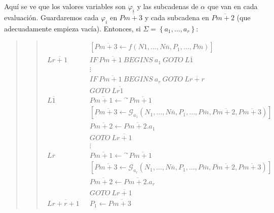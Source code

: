 \documentclass[a4paper, 12pt]{article}
\begin{document}
Aquí se ve que los valores variables son $\varphi_i$ y las subcadenas de
$\alpha$ que van en cada evaluación. Guardaremos cada $\varphi_i$ en
$P\overline{m+3}$ y cada subcadena en $P\overline{m+2}$ (que adecuadamente
empieza vacía). Entonces, si $\Sigma = \left\{ a_1, \ldots, a_r \right\} $:


\small
\begin{quote}

\begin{quote}
\begin{align*}
    &[ P\overline{m+3} \leftarrow  f(N1, \ldots, N{\overline{n}}, P_1, \ldots, P
    \overline{m})] \\ 
    L \overline{r+1} ~ ~ ~  &IF ~ P \overline{m+1} ~ BEGINS ~ a_1 ~ GOTO ~ L \overline{1} \\ 
          &\vdots \\ 
          &IF ~ P \overline{m+1} ~ BEGINS ~ a_r ~ GOTO ~ L
    \overline{r+r} \\ 
                          &GOTO ~ L \overline{r1} \\
    L \overline{1} ~ ~ ~ & P \overline{m+1} \leftarrow  {}^{\curvearrowright}
    P \overline{m+1} \\ 
                           &\left[ P \overline{m+3} \leftarrow
                           \mathcal{G}_{a_{1}} \left( N_1, \ldots, N
                       \overline{n}, P_1, \ldots, P \overline{m}, P
               \overline{m+2}, P \overline{m+3} \right)  \right]  \\ 
                           &P \overline{m+2} \leftarrow P \overline{m+2}.a_1 \\ 
                           & GOTO ~ L \overline{r+1} \\
    & \vdots \\
    L \overline{r} ~ ~ ~ & P \overline{m+1} \leftarrow  {}^{\curvearrowright}
    P \overline{m+1} \\ 
                           &\left[ P \overline{m+3} \leftarrow
                           \mathcal{G}_{a_{r}} \left( N_1, \ldots, N
                       \overline{n}, P_1, \ldots, P \overline{m}, P
               \overline{m+2}, P \overline{m+3} \right)  \right]  \\ 
                           &P \overline{m+2} \leftarrow P \overline{m+2}.a_r\\
                           & GOTO ~ L \overline{r+1} \\ 
    L \overline{r+r +1} ~ ~ ~ &P_1 \leftarrow  P \overline{m+3}
\end{align*}
\end{quote}

\end{quote}
\normalsize
\end{document}

